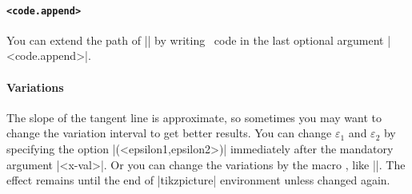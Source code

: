 \paragraph{\texttt{<code.append>}}
You can extend the path of |\tztangentat| by writing \Tikz\ code in the last optional argument |<code.append>|.

\begin{tzcode}{.3}
\end{tzcode}



\paragraph{Variations}
The slope of the tangent line is approximate, so sometimes you may want to change the variation interval to get better results.
You can change $\varepsilon_1$ and $\varepsilon_2$ by specifying the option |(<epsilon1,epsilon2>)| immediately after the mandatory argument |{<x-val>}|.
Or you can change the variations by the macro \icmd{\settztangentepsilon},
like ||. The effect remains until the end of |tikzpicture| environment unless changed again.

\begin{tzcode}{.3}
\end{tzcode}




\subsection{\protect\cmd{\tztangent}}
\label{ss:tztangent}


